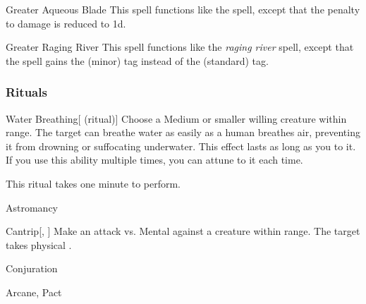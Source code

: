 \lowercase{\hypertarget{spell:Greater Aqueous Blade}{}}\label{spell:Greater Aqueous Blade}
\begin{ability}[\nth{5}]{\hypertarget{spell:Greater Aqueous Blade}{Greater Aqueous Blade}}
This spell functions like the  spell, except that the penalty to damage is reduced to \minus1d.
\end{ability}
\vspace{0.25em}



\lowercase{\hypertarget{spell:Greater Raging River}{}}\label{spell:Greater Raging River}
\begin{ability}[\nth{6}]{\hypertarget{spell:Greater Raging River}{Greater Raging River}}
This spell functions like the \textit{raging river} spell, except that the spell gains the  (minor) tag instead of the  (standard) tag.
\end{ability}
\vspace{0.25em}



\subsubsection{Rituals}


\lowercase{\hypertarget{spell:Water Breathing}{}}\label{spell:Water Breathing}
\begin{ability}[\nth{2}]{\hypertarget{spell:Water Breathing}{Water Breathing}}[ (ritual)]
Choose a Medium or smaller willing creature within \rngclose range.
The target can breathe water as easily as a human breathes air, preventing it from drowning or suffocating underwater.
This effect lasts as long as you  to it.
If you use this ability multiple times, you can attune to it each time.

This ritual takes one minute to perform.
\end{ability}
\vspace{0.25em}


\newpage
\begin{spellsection}{Astromancy}

\begin{spellheader}
\end{spellheader}


\begin{ability}{Cantrip}[, ]
Make an attack vs. Mental against a creature within \rngmed range.
\hit The target takes physical .
\end{ability}




 Conjuration

 Arcane, Pact
\end{spellsection}


